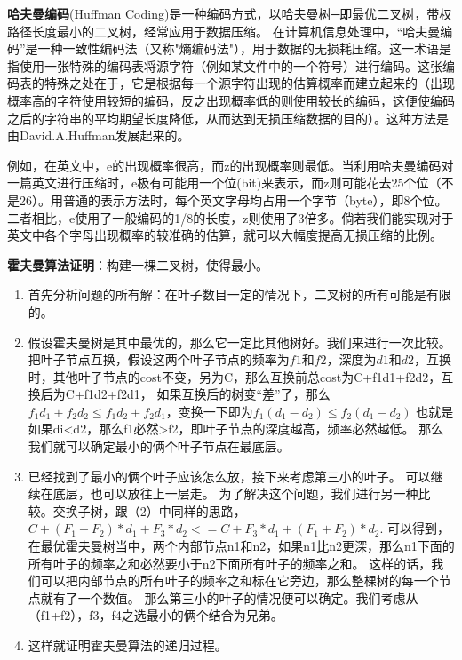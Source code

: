 \documentclass[12pt,a4paper]{article}
\begin{document}
\textbf{哈夫曼编码}(Huffman Coding)是一种编码方式，以哈夫曼树─即最优二叉树，带权路径长度最小的二叉树，经常应用于数据压缩。 在计算机信息处理中，“哈夫曼编码”是一种一致性编码法（又称"熵编码法"），用于数据的无损耗压缩。这一术语是指使用一张特殊的编码表将源字符（例如某文件中的一个符号）进行编码。这张编码表的特殊之处在于，它是根据每一个源字符出现的估算概率而建立起来的（出现概率高的字符使用较短的编码，反之出现概率低的则使用较长的编码，这便使编码之后的字符串的平均期望长度降低，从而达到无损压缩数据的目的）。这种方法是由David.A.Huffman发展起来的。

例如，在英文中，e的出现概率很高，而z的出现概率则最低。当利用哈夫曼编码对一篇英文进行压缩时，e极有可能用一个位(bit)来表示，而z则可能花去25个位（不是26）。用普通的表示方法时，每个英文字母均占用一个字节（byte），即8个位。二者相比，e使用了一般编码的1/8的长度，z则使用了3倍多。倘若我们能实现对于英文中各个字母出现概率的较准确的估算，就可以大幅度提高无损压缩的比例。


\textbf{霍夫曼算法证明}：构建一棵二叉树，使得最小。
\begin{enumerate}
  \item 首先分析问题的所有解：在叶子数目一定的情况下，二叉树的所有可能是有限的。
\item 假设霍夫曼树是其中最优的，那么它一定比其他树好。我们来进行一次比较。
把叶子节点互换，假设这两个叶子节点的频率为$f1$和$f2$，深度为$d1$和$d2$，互换时，其他叶子节点的cost不变，另为C，那么互换前总cost为C+f1d1+f2d2，互换后为C+f1d2+f2d1，
如果互换后的树变“差”了，那么$f_1d_1+f_2d_2 \le f_1d_2 + f_2d_1$，变换一下即为$f_1(d_1-d_2)\le f_2(d_1-d_2)$
也就是如果di<d2，那么f1必然>f2，即叶子节点的深度越高，频率必然越低。
那么我们就可以确定最小的俩个叶子节点在最底层。
\item 已经找到了最小的俩个叶子应该怎么放，接下来考虑第三小的叶子。
可以继续在底层，也可以放往上一层走。
为了解决这个问题，我们进行另一种比较。交换子树，跟（2）中同样的思路，$C+(F_1+F_2)*d_1+F_3*d_2 <= C+F_3*d_1+(F_1+F_2)*d_2$.
可以得到，在最优霍夫曼树当中，两个内部节点n1和n2，如果n1比n2更深，那么n1下面的所有叶子的频率之和必然要小于n2下面所有叶子的频率之和。
这样的话，我们可以把内部节点的所有叶子的频率之和标在它旁边，那么整棵树的每一个节点就有了一个数值。
那么第三小的叶子的情况便可以确定。我们考虑从（f1+f2），f3，f4之选最小的俩个结合为兄弟。
\item 这样就证明霍夫曼算法的递归过程。
\end{enumerate}
\end{document}
